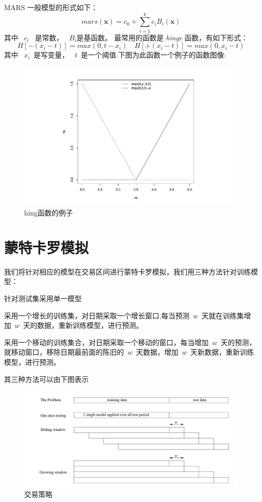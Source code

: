 \documentclass{article}\usepackage[]{graphicx}\usepackage[]{color}
\begin{document}
\begin{CJK*}{UTF8}{gkai}
MARS 一般模型的形式如下：
$$mars(\mathbf{x}) = c_0 + \sum_{i=1}^kc_iB_i(\mathbf{x})$$
其中 ~$c_i$~ 是常数， ~$B_i$是基函数。
最常用的函数是 \textit{hinge} 函数，有如下形式：
$$H[-(x_i - t)] = max(0, t - x_i) \quad H[+(x_i - t)] = max(0, x_i - t)$$
其中 ~$x_i$~是写变量，  ~$t$~是一个阈值.下图为此函数一个例子的函数图像:
\begin{figure}[ht]
\centering
\includegraphics[width = 12cm]{./mar.jpeg}
\caption{hing函数的例子}\label{fig4.1}
\end{figure}
\section{蒙特卡罗模拟}
我们将针对相应的模型在交易区间进行蒙特卡罗模拟，我们用三种方法针对训练模型：

\textbullet 针对测试集采用单一模型

\textbullet 采用一个增长的训练集，对日期采取一个增长窗口,每当预测~$w$~天就在训练集增加~$w$~天的数据，重新训练模型，进行预测。

\textbullet 采用一个移动的训练集合，对日期采取一个移动的窗口，每当增加~$w$~天的预测，就移动窗口，移除日期最前面的陈旧的~$w$~天数据，增加~$w$~天新数据，重新训练模型，进行预测。

其三种方法可以由下图表示
\begin{figure}[ht]
\centering
\includegraphics[width = 12cm]{./method.jpeg}
\caption{交易策略}
\end{figure}

\end{CJK*}
\end{document}

